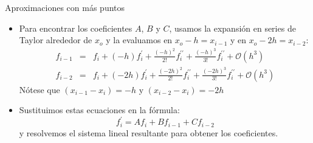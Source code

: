 \documentclass{beamer}
\begin{document}
\begin{frame}{Aproximaciones con más puntos}
\begin{itemize}
\item Para encontrar los coeficientes $A$, $B$ y $C$, usamos la expansión en series de Taylor alrededor de $x_o$
y la evaluamos en $x_o - h = x_{i-1}$ y en $x_o - 2h = x_{i-2}$:
\begin{eqnarray*}
	f_{i-1} & = & f_i + (-h) f^\prime_i + \frac{(-h)^2}{2!} f^{\prime\prime}_i + 
	\frac{(-h)^3}{3!} f^{\prime\prime}_i + \mathcal{O}(h^3) \\
	f_{i-2} & = & f_i + (-2h) f^\prime_i + \frac{(-2 h)^2}{2!} f^{\prime\prime}_i + 
	\frac{(-2 h)^3}{3!} f^{\prime\prime}_i + \mathcal{O}(h^3) 
\end{eqnarray*}
\noindent Nótese que $(x_{i-1} - x_{i}) = -h$ y $(x_{i-2} - x_{i}) = -2h$

\item Sustituimos estas ecuaciones en la fórmula: 
\[
f^\prime_i= A f_i + B f_{i-1} + C f_{i-2}
\]
y resolvemos el sistema lineal resultante para obtener los coeficientes.
\end{itemize}
\end{frame}
\end{document}
